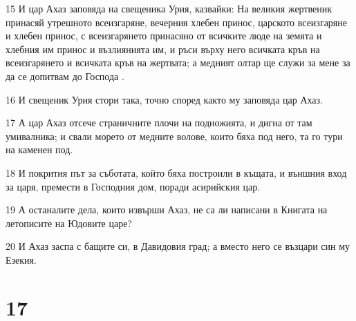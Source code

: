 \par 15 И цар Ахаз заповяда на свещеника Урия, казвайки: На великия жертвеник принасяй утрешното всеизгаряне, вечерния хлебен принос, царското всеизгаряне и хлебен принос, с всеизгарянето принасяно от всичките люде на земята и хлебния им принос и възлиянията им, и ръси върху него всичката кръв на всеизгарянето и всичката кръв на жертвата; а медният олтар ще служи за мене за да се допитвам до Господа .
\par 16 И свещеник Урия стори така, точно според както му заповяда цар Ахаз.
\par 17 А цар Ахаз отсече страничните плочи на подножията, и дигна от там умивалника; и свали морето от медните волове, които бяха под него, та го тури на каменен под.
\par 18 И покрития път за съботата, който бяха построили в къщата, и външния вход за царя, премести в Господния дом, поради асирийския цар.
\par 19 А останалите дела, които извърши Ахаз, не са ли написани в Книгата на летописите на Юдовите царе?
\par 20 И Ахаз заспа с бащите си, в Давидовия град; а вместо него се възцари син му Езекия.

\chapter{17}

